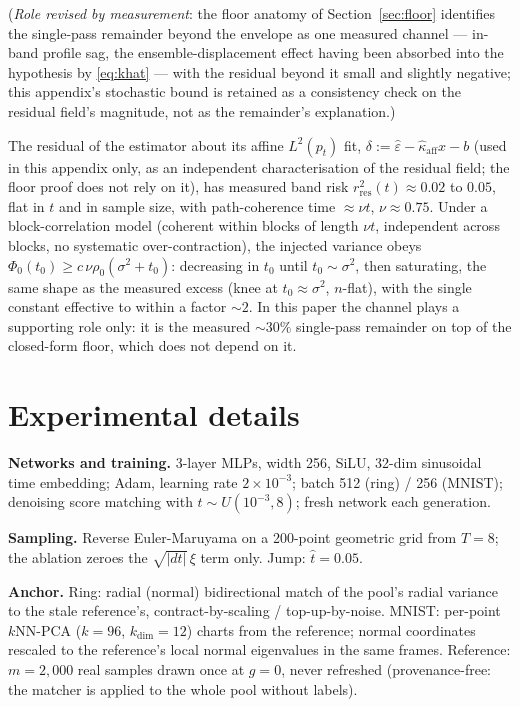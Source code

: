 \documentclass[11pt]{article}
\theoremstyle{remark}
\newcommand{\epshat}{\hat\varepsilon}
\newcommand{\sigsq}{\sigma^2}
\begin{document}
(\emph{Role revised by measurement}: the floor anatomy of Section~\ref{sec:floor}
identifies the single-pass remainder beyond the envelope as one measured channel ---
in-band profile sag, the ensemble-displacement effect having been absorbed into the
hypothesis by \eqref{eq:khat} --- with the residual beyond it small and slightly negative; this appendix's stochastic bound is
retained as a consistency check on the residual field's magnitude, not as the
remainder's explanation.)

The residual of the estimator about its affine $L^2(p_t)$ fit,
$\delta:=\epshat-\hat\kappa_{\mathrm{aff}}x-b$ (used in this appendix only, as an
independent characterisation of the residual field; the floor proof does not rely on it),
has measured band risk
$r^2_{\mathrm{res}}(t)\approx0.02$ to $0.05$, flat in $t$ and in sample size, with
path-coherence time $\approx\nu t$, $\nu\approx0.75$. Under a block-correlation model
(coherent within blocks of length $\nu t$, independent across blocks, no systematic
over-contraction), the injected variance obeys
$\Phi_0(t_0)\ge c\,\nu\rho_0(\sigsq+t_0)$: decreasing in $t_0$ until $t_0\sim\sigsq$,
then saturating, the same shape as the measured excess (knee at $t_0\approx\sigsq$,
$n$-flat), with the single constant effective to within a factor $\sim2$. In this paper
the channel plays a supporting role only: it is the measured $\sim30\%$ single-pass
remainder on top of the closed-form floor, which does not depend on it.

\section{Experimental details}\label{app:details}

\textbf{Networks and training.} 3-layer MLPs, width 256, SiLU, 32-dim sinusoidal time
embedding; Adam, learning rate $2\times10^{-3}$; batch 512 (ring) / 256 (MNIST);
denoising score matching with $t\sim U(10^{-3},8)$; fresh network each generation.

\textbf{Sampling.} Reverse Euler-Maruyama on a 200-point geometric grid from $T=8$;
the ablation zeroes the $\sqrt{|dt|}\,\xi$ term only. Jump: $\hat t=0.05$.

\textbf{Anchor.} Ring: radial (normal) bidirectional match of the pool's radial
variance to the stale reference's, contract-by-scaling / top-up-by-noise. MNIST:
per-point $k$NN-PCA ($k=96$, $k_{\dim}=12$) charts from the reference; normal
coordinates rescaled to the reference's local normal eigenvalues in the same frames.
Reference: $m=2{,}000$ real samples drawn once at $g=0$, never refreshed
(provenance-free: the matcher is applied to the whole pool without labels).
\end{document}
